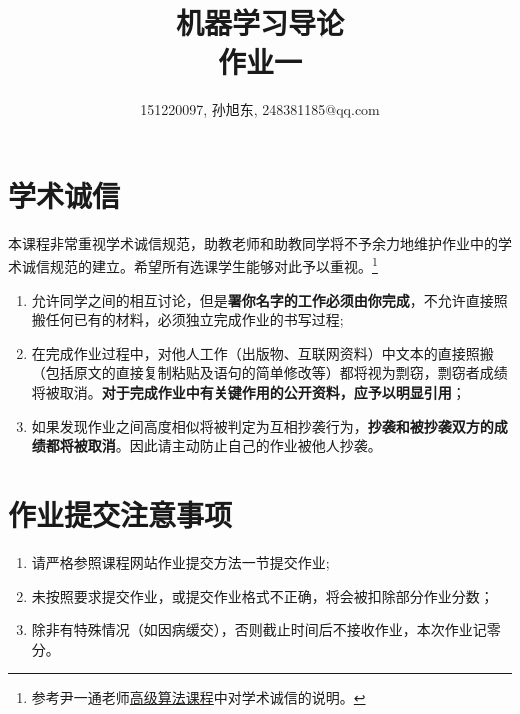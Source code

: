 \documentclass[a4paper,UTF8]{article}
\numberwithin{equation}{section}
\begin{document}
\title{机器学习导论\\
作业一}
\author{151220097, 孙旭东, 248381185@qq.com}
\maketitle

\section*{学术诚信}

本课程非常重视学术诚信规范，助教老师和助教同学将不予余力地维护作业中的学术诚信规范的建立。希望所有选课学生能够对此予以重视。\footnote{参考尹一通老师\href{http://tcs.nju.edu.cn/wiki/index.php/\%E9\%9A\%8F\%E6\%9C/\%BA\%E7\%AE\%97\%E6\%B3\%95\_(Fall\_2015)}{高级算法课程}中对学术诚信的说明。}

\begin{tcolorbox}
\begin{enumerate}
  \item[(1)] 允许同学之间的相互讨论，但是{\color{red}\textbf{署你名字的工作必须由你完成}}，不允许直接照搬任何已有的材料，必须独立完成作业的书写过程;
  \item[(2)] 在完成作业过程中，对他人工作（出版物、互联网资料）中文本的直接照搬（包括原文的直接复制粘贴及语句的简单修改等）都将视为剽窃，剽窃者成绩将被取消。{\color{red}\textbf{对于完成作业中有关键作用的公开资料，应予以明显引用}}；
  \item[(3)] 如果发现作业之间高度相似将被判定为互相抄袭行为，{\color{red}\textbf{抄袭和被抄袭双方的成绩都将被取消}}。因此请主动防止自己的作业被他人抄袭。
\end{enumerate}
\end{tcolorbox}

\section*{作业提交注意事项}
\begin{tcolorbox}
\begin{enumerate}
  \item[(1)] 请严格参照课程网站作业提交方法一节提交作业;
  \item[(2)] 未按照要求提交作业，或提交作业格式不正确，将会被扣除部分作业分数；
  \item[(3)] 除非有特殊情况（如因病缓交），否则截止时间后不接收作业，本次作业记零分。
\end{enumerate}
\end{tcolorbox}
\end{document}
